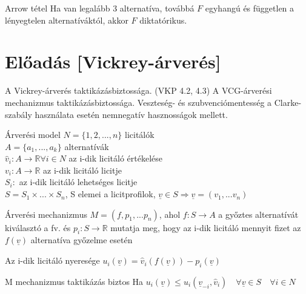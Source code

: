 	\begin{theorem}{Arrow tétel}{}
		Ha van legalább 3 alternatíva, továbbá $F$ egyhangú és független a lényegtelen alternatíváktól, akkor $F$ diktatórikus.
	\end{theorem}
	
	
	\newpage
	\section{Előadás [Vickrey-árverés]}
	A Vickrey-árverés taktikázásbiztossága. (VKP 4.2, 4.3)
	A VCG-árverési mechanizmus taktikázásbiztossága. Veszteség- és szubvenciómentesség a Clarke-szabály használata esetén nemnegatív hasznosságok mellett.
	\begin{definition}{Árverési model}{}
		$N = \{1, 2, ..., n\}$ licitálók\\ 
		$A = \{a_1, ..., a_k\}$ alternatívák \\
		$\hat{v}_i: A \rightarrow \mathbb{R} \forall i \in N$ az i-dik licitáló értékelése \\
		$v_i: A \rightarrow \mathbb{R}$ az i-dik licitáló licitje \\
		$S_i:$ az i-dik licitáló lehetséges licitje\\
		$S = S_1 \times ... \times S_n$, S elemei a licitprofilok, $\underline{v} \in S \Rightarrow \underline{v} = (v_1, ... v_n)$
	\end{definition}
	
	
	\begin{definition}{Árverési mechanizmus}{}
		$M = (f, p_1, ... p_n)$, ahol $f: S \rightarrow A$ a győztes alternatívát kiválasztó a fv. és $p_i: S \rightarrow \mathbb{R}$ mutatja meg, hogy az i-dik licitáló mennyit fizet az $f(\underline{v})$ alternatíva győzelme esetén
	\end{definition}
	
	Az i-dik licitáló nyeresége $u_i(\underline{v}) = \hat{v}_i (f(\underline{v}))-p_i(\underline{v})$
	
	\begin{definition}{M mechanizmus taktikázás biztos}{}
		Ha $u_i(\underline{v}) \leq u_i(\underline{v}_{-i},\hat{v}_i) \quad \forall \underline{v} \in S \quad \forall i \in N$
	\end{definition}
	
